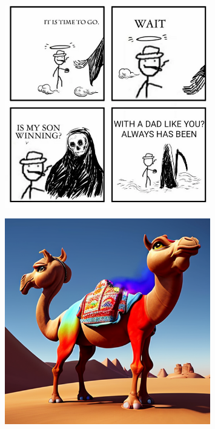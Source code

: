 \documentclass[a4paper]{article}
\begin{document}
\begin{figure}[htbp]
\centering
\includegraphics[width=0.8\textwidth]{meme-time-to-go.png}

\label{fig:meme-time-to-go}
\end{figure}

\begin{figure}[htbp]
\centering
\includegraphics[width=0.8\textwidth]{meme-two-headed-camel.png}

\label{fig:meme-two-headed-camel}
\end{figure}

\clearpage
\end{document}
